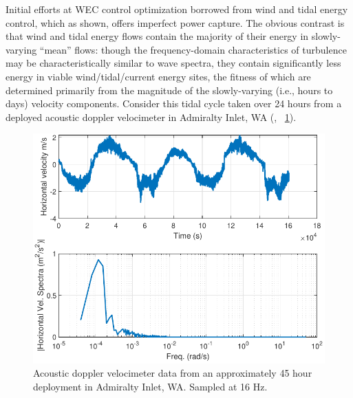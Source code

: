 \documentclass[lettersize,journal]{IEEEtran}
\begin{document}





Initial efforts at WEC control optimization borrowed from wind and tidal energy control, which as shown, offers imperfect power capture.
The obvious contrast is that wind and tidal energy flows contain the majority of their energy in slowly-varying ``mean'' flows: though the frequency-domain characteristics of turbulence may be characteristically similar to wave spectra, they contain significantly less energy in viable wind/tidal/current energy sites, the fitness of which are determined primarily from the magnitude of the slowly-varying (i.e., hours to days) velocity components.
Consider this tidal cycle taken over 24 hours from a deployed acoustic doppler velocimeter in Admiralty Inlet, WA (\cite{NREL2015}, \figurename~\ref{fig: TidalVelocity}).

\begin{figure}
        \centering \includegraphics[width=\columnwidth]{TidalVelocity.pdf}
        \caption{Acoustic doppler velocimeter data from an approximately 45 hour deployment in Admiralty Inlet, WA.
        Sampled at 16 Hz.}
        \label{fig: TidalVelocity}
\end{figure}
\end{document}
